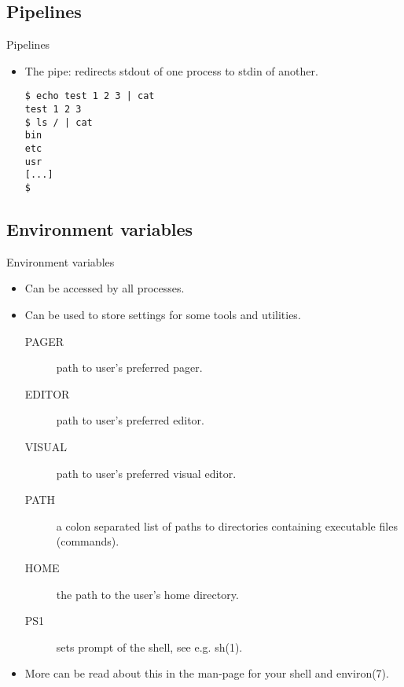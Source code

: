 \documentclass[handout]{beamer}
\begin{document}
\subsection{Pipelines}
\begin{frame}[fragile]{Pipelines}
	\begin{itemize}
		\item The pipe: redirects stdout of one process to stdin of another.
			\begin{lstlisting}
$ echo test 1 2 3 | cat
test 1 2 3
$ ls / | cat
bin
etc
usr
[...]
$
			\end{lstlisting}
	\end{itemize}
\end{frame}

\subsection{Environment variables}
\begin{frame}{Environment variables}
	\begin{itemize}
		\item<1> Can be accessed by all processes.
		\item<2> Can be used to store settings for some tools and utilities.
			\begin{description}
				\item[PAGER] path to user's preferred pager.
				\item[EDITOR] path to user's preferred editor.
				\item[VISUAL] path to user's preferred visual editor.
				\item[PATH] a colon separated list of paths to directories containing 
					executable files (commands).
				\item[HOME] the path to the user's home directory.
				\item[PS1] sets prompt of the shell, see e.g. sh(1).
			\end{description}
		\item<3> More can be read about this in the man-page for your shell and 
			environ(7).
	\end{itemize}
\end{frame}
\end{document}
